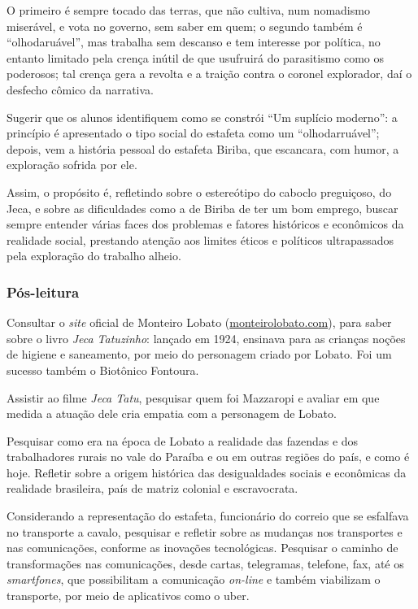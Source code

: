 \documentclass[11pt]{extarticle}
\begin{document}
O primeiro é sempre tocado das terras, que não
cultiva, num nomadismo miserável, e vota no governo, sem saber em quem;
o segundo também é ``olhodaruável'', mas trabalha sem descanso e tem
interesse por política, no entanto limitado pela crença inútil de que
usufruirá do parasitismo como os poderosos; tal crença gera a revolta e
a traição contra o coronel explorador, daí o desfecho cômico da
narrativa.


Sugerir que os alunos identifiquem como se constrói ``Um suplício
moderno'': a princípio é apresentado o tipo social do estafeta como um
``olhodarruável''; depois, vem a história pessoal do estafeta Biriba,
que escancara, com humor, a exploração sofrida por ele.

Assim, o propósito é, refletindo sobre o estereótipo do caboclo
preguiçoso, do Jeca, e sobre as dificuldades como a de Biriba de ter um
bom emprego, buscar sempre entender várias faces dos problemas e fatores
históricos e econômicos da realidade social, prestando atenção aos
limites éticos e políticos ultrapassados pela exploração do trabalho
alheio.

\subsubsection{Pós-leitura}

Consultar o \emph{site} oficial de Monteiro Lobato
(\href{http://www.monteirolobato.com/miscelania/jeca-tatuzinho}{monteirolobato.com}), para
saber sobre o livro \emph{Jeca Tatuzinho}: lançado em 1924, ensinava
para as crianças noções de higiene e saneamento, por meio do personagem
criado por Lobato. Foi um sucesso também o Biotônico Fontoura.

Assistir ao filme \emph{Jeca Tatu}, pesquisar quem foi Mazzaropi e
avaliar em que medida a atuação dele cria empatia com a personagem de
Lobato.


Pesquisar como era na época de Lobato a realidade das fazendas e dos
trabalhadores rurais no vale do Paraíba e ou em outras regiões do país,
e como é hoje. Refletir sobre a origem histórica das desigualdades
sociais e econômicas da realidade brasileira, país de matriz colonial e
escravocrata.

Considerando a representação do estafeta, funcionário do correio que se
esfalfava no transporte a cavalo, pesquisar e refletir sobre as mudanças
nos transportes e nas comunicações, conforme as inovações tecnológicas.
Pesquisar o caminho de transformações nas comunicações, desde cartas,
telegramas, telefone, fax, até os \emph{smartfones}, que possibilitam a
comunicação \emph{on-line} e também viabilizam o transporte, por meio de
aplicativos como o uber.
\end{document}

